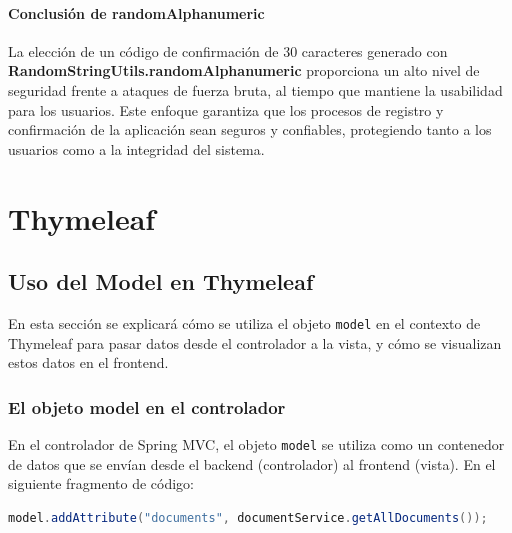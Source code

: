 \documentclass[draft]{scrbook}
\begin{document}
\paragraph{Conclusión de randomAlphanumeric}

La elección de un código de confirmación de 30 caracteres generado con \textbf{RandomStringUtils.randomAlphanumeric} proporciona un alto nivel de seguridad frente a ataques de fuerza bruta, al tiempo que mantiene la usabilidad para los usuarios. Este enfoque garantiza que los procesos de registro y confirmación de la aplicación sean seguros y confiables, protegiendo tanto a los usuarios como a la integridad del sistema.


\section{Thymeleaf}
\subsection{Uso del Model en Thymeleaf}

En esta sección se explicará cómo se utiliza el objeto \texttt{model} en el contexto de Thymeleaf para pasar datos desde el controlador a la vista, y cómo se visualizan estos datos en el frontend.

\subsubsection{El objeto model en el controlador}

En el controlador de Spring MVC, el objeto \texttt{model} se utiliza como un contenedor de datos que se envían desde el backend (controlador) al frontend (vista). En el siguiente fragmento de código:

\begin{lstlisting}[language=Java]
model.addAttribute("documents", documentService.getAllDocuments());
\end{lstlisting}
\end{document}

